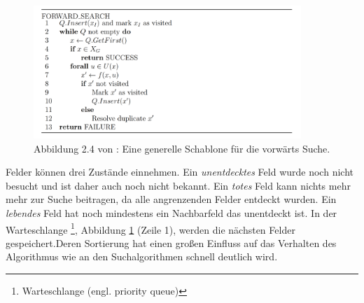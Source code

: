 \begin{figure}
	\centering
	\includegraphics[width=0.9\textwidth]{images/img225.png}
	\caption{Abbildung 2.4 von \cite[~S. 33]{Lav06}:  Eine generelle Schablone für die vorwärts Suche.}
	\label{lav04}
\end{figure}
\noindent
Felder können drei Zustände einnehmen.
Ein \textit{unentdecktes} Feld wurde noch nicht besucht und ist daher auch noch nicht bekannt.
Ein \textit{totes} Feld kann nichts mehr mehr zur Suche beitragen, da alle angrenzenden Felder entdeckt wurden.
Ein \textit{lebendes} Feld hat noch mindestens ein Nachbarfeld das unentdeckt ist.
%
%
In der Warteschlange \footnote{Warteschlange (engl. priority queue)}, Abbildung \ref{lav04} (Zeile 1), werden die nächsten Felder gespeichert.Deren Sortierung hat einen großen Einfluss auf das Verhalten des Algorithmus wie an den Suchalgorithmen schnell deutlich wird. 
